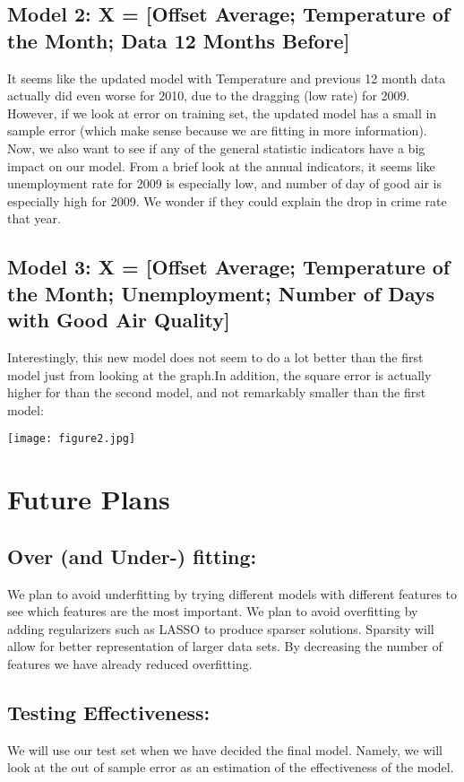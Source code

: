 \documentclass{article}
\begin{document}
\subsection*{Model 2: X = [Offset Average; Temperature of the Month; Data 12 Months Before]}
It seems like the updated model with Temperature and previous 12 month data actually did even worse for 2010, due to the dragging (low rate) for 2009. However, if we look at error on training set, the updated model has a small in sample error (which make sense because we are fitting in more information). 
Now, we also want to see if any of the general statistic indicators have a big impact on our model. From a brief look at the annual indicators, it seems like unemployment rate for 2009 is especially low, and number of day of good air is especially high for 2009. We wonder if they could explain the drop in crime rate that year. 

\subsection*{Model 3: X = [Offset Average; Temperature of the Month; Unemployment; Number of Days with Good Air Quality]}
Interestingly, this new model does not seem to do a lot better than the first model just from looking at the graph.In addition, the square error is actually higher for than the second model, and not remarkably smaller than the first model:

\centerline{\texttt{[image: figure2.jpg]}}


\section*{Future Plans}
\subsection*{Over (and Under-) fitting:}
We plan to avoid underfitting by trying different models with different features to see which features are the most important.  We plan to avoid overfitting by adding regularizers such as LASSO to produce sparser solutions.  Sparsity will allow for better representation of larger data sets. By decreasing the number of features we have already reduced overfitting.  

\subsection*{Testing Effectiveness:}
We will use our test set when we have decided the final model. Namely, we will look at the out of sample error as an estimation of the effectiveness of the model.
\end{document}
